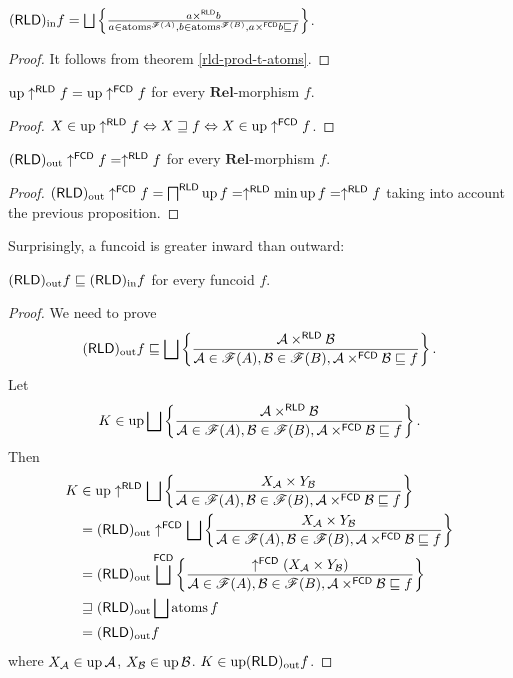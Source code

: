 \begin{thm}
$(\mathsf{RLD})_{\mathrm{in}} f=\bigsqcup\left\{ \frac{a\times^{\mathsf{RLD}}b}{a\in\operatorname{atoms}^{\mathscr{F}(A)},b\in\operatorname{atoms}^{\mathscr{F}(B)},a\times^{\mathsf{FCD}}b\sqsubseteq f}\right\}$.\end{thm}
\begin{proof}
It follows from theorem \ref{rld-prod-t-atoms}.\end{proof}
\begin{prop}
$\operatorname{up}\uparrow^{\mathsf{RLD}}f=\operatorname{up}\uparrow^{\mathsf{FCD}}f$ for every
$\mathbf{Rel}$-morphism $f$.\end{prop}
\begin{proof}
$X\in\operatorname{up}\uparrow^{\mathsf{RLD}}f\Leftrightarrow X\sqsupseteq f\Leftrightarrow X\in\operatorname{up}\uparrow^{\mathsf{FCD}}f$.\end{proof}
\begin{prop}
$(\mathsf{RLD})_{\mathrm{out}}\uparrow^{\mathsf{FCD}}f=\uparrow^{\mathsf{RLD}}f$ for
every $\mathbf{Rel}$-morphism $f$.\end{prop}
\begin{proof}
$(\mathsf{RLD})_{\mathrm{out}}\uparrow^{\mathsf{FCD}}f=\bigsqcap^{\mathsf{RLD}}\operatorname{up} f=\uparrow^{\mathsf{RLD}}\min\operatorname{up} f=\uparrow^{\mathsf{RLD}}f$
taking into account the previous proposition.
\end{proof}
Surprisingly, a funcoid is greater inward than outward:
\begin{thm}
$(\mathsf{RLD})_{\mathrm{out}} f\sqsubseteq(\mathsf{RLD})_{\mathrm{in}} f$ for every funcoid $f$.\end{thm}
\begin{proof}
We need to prove
\[
(\mathsf{RLD})_{\mathrm{out}} f\sqsubseteq\bigsqcup\left\{ \frac{\mathcal{A}\times^{\mathsf{RLD}}\mathcal{B}}{\mathcal{A}\in\mathscr{F}(A),\mathcal{B}\in\mathscr{F}(B),\mathcal{A}\times^{\mathsf{FCD}}\mathcal{B}\sqsubseteq f}\right\}.
\]
Let 
\[
K\in\operatorname{up}\bigsqcup\left\{ \frac{\mathcal{A}\times^{\mathsf{RLD}}\mathcal{B}}{\mathcal{A}\in\mathscr{F}(A),\mathcal{B}\in\mathscr{F}(B),\mathcal{A}\times^{\mathsf{FCD}}\mathcal{B}\sqsubseteq f}\right\}.
\]
Then
\begin{align*}
K & \in\operatorname{up}\uparrow^{\mathsf{RLD}}\bigsqcup\left\{ \frac{X_{\mathcal{A}}\times Y_{\mathcal{B}}}{\mathcal{A}\in\mathscr{F}(A),\mathcal{B}\in\mathscr{F}(B),\mathcal{A}\times^{\mathsf{FCD}}\mathcal{B}\sqsubseteq f}\right\}\\
 & =(\mathsf{RLD})_{\mathrm{out}}\uparrow^{\mathsf{FCD}}\bigsqcup\left\{ \frac{X_{\mathcal{A}}\times Y_{\mathcal{B}}}{\mathcal{A}\in\mathscr{F}(A),\mathcal{B}\in\mathscr{F}(B),\mathcal{A}\times^{\mathsf{FCD}}\mathcal{B}\sqsubseteq f}\right\}\\
 & =(\mathsf{RLD})_{\mathrm{out}}\bigsqcup^{\mathsf{FCD}}\left\{ \frac{\uparrow^{\mathsf{FCD}}(X_{\mathcal{A}}\times Y_{\mathcal{B}})}{\mathcal{A}\in\mathscr{F}(A),\mathcal{B}\in\mathscr{F}(B),\mathcal{A}\times^{\mathsf{FCD}}\mathcal{B}\sqsubseteq f}\right\}\\
 & \sqsupseteq(\mathsf{RLD})_{\mathrm{out}}\bigsqcup\operatorname{atoms} f\\
 & =(\mathsf{RLD})_{\mathrm{out}} f
\end{align*}
where $X_{\mathcal{A}}\in\operatorname{up}\mathcal{A}$, $X_{\mathcal{B}}\in\operatorname{up}\mathcal{B}$.
$K\in\operatorname{up}(\mathsf{RLD})_{\mathrm{out}} f$.\end{proof}
